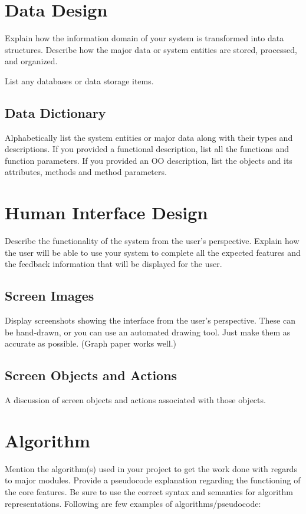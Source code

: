 \documentclass[A4paper,12pt]{report}
\theoremstyle{plain}
\theoremstyle{definition}
\theoremstyle{remark}
\numberwithin{equation}{section}
\begin{document}
\section{Data Design}
Explain how the information domain of your system is transformed into data structures. Describe how the major data or system entities are stored, processed, and organized. 

List any databases or data storage items.

\subsection{Data Dictionary}
Alphabetically list the system entities or major data along with their types and descriptions. If you provided a functional description, list all the functions and function parameters. If you provided an OO description, list the objects and its attributes, methods and method parameters. 

\section{Human Interface Design}
Describe the functionality of the system from the user’s perspective. Explain how the user will be able to use your system to complete all the expected features and the feedback information that will be displayed for the user.

\subsection{Screen Images} 
Display screenshots showing the interface from the user’s perspective. These can be hand-drawn, or you can use an automated drawing tool. Just make them as accurate as possible. (Graph paper works well.) 

\subsection{Screen Objects and Actions}
A discussion of screen objects and actions associated with those objects.


\section{Algorithm}
Mention the algorithm(s) used in your project to get the work done with regards to major modules. Provide a pseudocode explanation regarding the functioning of the core features. Be sure to use the correct syntax and semantics for algorithm representations. Following are few examples of algorithms/pseudocode:
\end{document}
